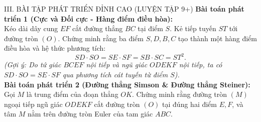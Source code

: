 \documentclass[11pt,a4paper]{article}
\begin{document}
\vspace{1mm}

\begin{exercisebox}{III. BÀI TẬP PHÁT TRIỂN ĐỈNH CAO (LUYỆN TẬP 9+)}
\textbf{Bài toán phát triển 1 (Cực và Đối cực - Hàng điểm điều hòa):}\\
Kéo dài dây cung $EF$ cắt đường thẳng $BC$ tại điểm $S$. Kẻ tiếp tuyến $ST$ tới đường tròn $(O)$. Chứng minh rằng ba điểm $S, D, B, C$ tạo thành một hàng điểm điều hòa và hệ thức phương tích:
\[
SD \cdot SO = SE \cdot SF = SB \cdot SC = ST^2.
\]
\textit{(Gợi ý: Do tứ giác $BCEF$ nội tiếp và ngũ giác $ODEKF$ nội tiếp, ta có $SD \cdot SO = SE \cdot SF$ qua phương tích cát tuyến từ điểm $S$).}\\[2mm]
\textbf{Bài toán phát triển 2 (Đường thẳng Simson \& Đường thẳng Steiner):}\\
Gọi $M$ là trung điểm của đoạn thẳng $OK$. Chứng minh rằng đường tròn $(M)$ ngoại tiếp ngũ giác $ODEKF$ cắt đường tròn $(O)$ tại đúng hai điểm $E, F$, và tâm $M$ nằm trên đường tròn Euler của tam giác $ABC$.
\end{exercisebox}
\end{document}
